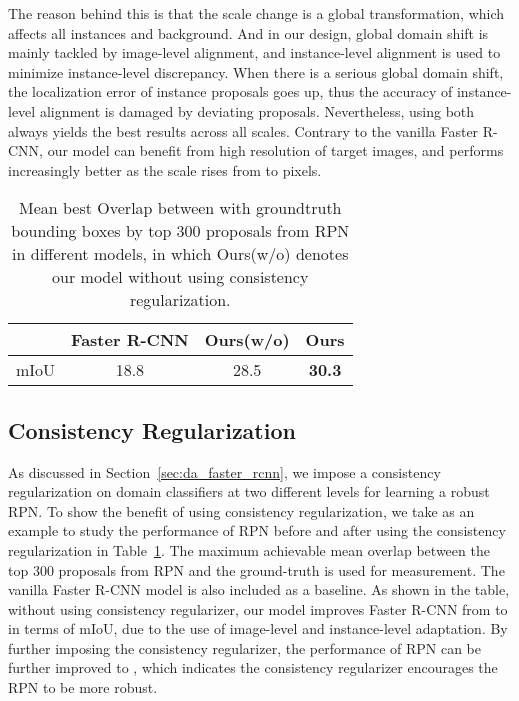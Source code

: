 \documentclass[10pt,twocolumn,letterpaper]{article}
\begin{document}
The reason behind this is that the scale change is a global transformation, which affects all instances and background. And in our design, global domain shift is mainly tackled by image-level alignment, and instance-level alignment is used to minimize instance-level discrepancy. When there is a serious global domain shift, the localization error of instance proposals goes up, thus the accuracy of instance-level alignment is damaged by deviating proposals. Nevertheless, using both always yields the best results across all scales. Contrary to the vanilla Faster R-CNN, our model can benefit from high resolution of target images, and performs increasingly better as the scale rises from  to  pixels.  

\begin{table}
\center
\begin{tabular}{c| c| c | c}
  \hline
  & Faster R-CNN &  Ours(w/o) & Ours \\ \hline \hline
  mIoU & 18.8 & 28.5 & \bf{30.3}\\ \hline
\end{tabular}
\vspace{3mm}
\caption{Mean best Overlap between with groundtruth bounding boxes by top 300 proposals from RPN in different models, in which Ours(w/o) denotes our model without using consistency regularization.}
\vspace{-3mm}

\label{tab:consistency}
\end{table}

\subsection{Consistency Regularization}
As discussed in Section~\ref{sec:da_faster_rcnn}, we impose a consistency regularization on domain classifiers at two different levels for learning a robust RPN. To show the benefit of using consistency regularization, we take  as an example to study the performance of RPN before and after using the consistency regularization in Table~\ref{tab:consistency}. The maximum  achievable mean overlap between the top 300 proposals from RPN and the ground-truth is used for measurement. The vanilla Faster R-CNN model is also included as a baseline. As shown in the table, without using consistency regularizer, our model improves Faster R-CNN from  to  in terms of mIoU, due to the use of image-level and instance-level adaptation. By further imposing the consistency regularizer, the performance of RPN can be further improved to , which indicates the consistency regularizer encourages the RPN to be more robust. 
\end{document}

